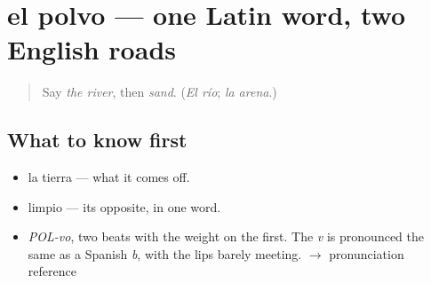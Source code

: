 \section[el polvo]{el polvo — one Latin word, two English roads}

\label{lesson:ES-C369-polvo}



\begin{quote}
Say \emph{the river}, then \emph{sand}. (\emph{El río}; \emph{la arena}.)
\end{quote}

\subsection*{What to know first}
\begin{itemize}
\raggedright
  \item la tierra — what it comes off.
  \item limpio — its opposite, in one word.
\end{itemize}

\begin{sounds}
\begin{itemize}
\raggedright
  \item \emph{POL-vo}, two beats with the weight on the first. The \emph{v} is pronounced the same as a Spanish \emph{b}, with the lips barely meeting. $\to$ pronunciation reference
\end{itemize}
\end{sounds}

